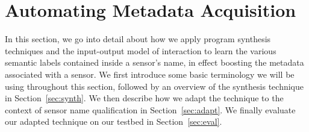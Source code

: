\section{Automating Metadata Acquisition}
%
%

In this section, we go into detail about how we apply program synthesis techniques and the input-output model of interaction to learn the various semantic labels contained inside a sensor's name, in effect boosting the metadata associated with a sensor.  We first introduce some basic terminology we will be using throughout this section, followed by an overview of the synthesis technique in Section~\ref{sec:synth}. We then describe how we adapt the technique to the context of sensor name qualification in Section~\ref{sec:adapt}.  We finally evaluate our adapted technique on our testbed in Section~\ref{sec:eval}.

%

